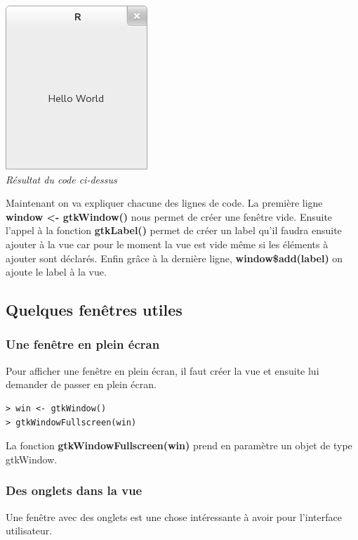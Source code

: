 \begin{center}
\includegraphics[scale=0.5]{hello.png}\\
\textit{Résultat du code ci-dessus}
\end{center}

Maintenant on va expliquer chacune des lignes de code. La première ligne \textbf{window <- gtkWindow()} nous permet de créer une fen\^etre vide. Ensuite l'appel à la fonction \textbf{gtkLabel()} permet de créer un label qu'il faudra ensuite ajouter à la vue car pour le moment la vue est vide m\^eme si les éléments à ajouter sont déclarés. Enfin gr\^ace à la dernière ligne, \textbf{window\$add(label)} on ajoute le label à la vue. \\

\subsection{Quelques fen\^etres utiles}

\subsubsection{Une fen\^etre en plein écran}
Pour afficher une fen\^etre en plein écran, il faut créer la vue et ensuite lui demander de passer en plein écran. 

\begin{lstlisting}
> win <- gtkWindow()
> gtkWindowFullscreen(win)
\end{lstlisting}

La fonction \textbf{gtkWindowFullscreen(win)} prend en paramètre un objet de type gtkWindow. 

\subsubsection{Des onglets dans la vue}
Une fen\^etre avec des onglets est une chose intéressante à avoir pour l'interface utilisateur. 

